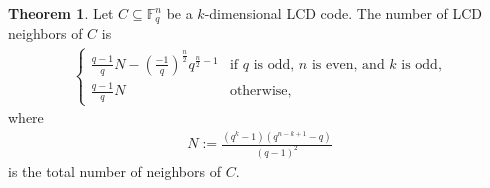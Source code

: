 \documentclass[11pt]{article}
\theoremstyle{definition}
\newtheorem{theorem}{Theorem}[section]
\newcommand{\F}{\mathbb{F}}
\newcommand{\Leg}[2]{\left(\frac{#1}{#2}\right)}                       %
\begin{document}
\begin{theorem}\label{thm:LCD-neighbors}
	Let $C \subseteq \F_q^n$ be a $k$-dimensional LCD code.
	The number of LCD neighbors of $C$ is
	\begin{align*}
		\begin{cases}
			\frac{q - 1}{q} N - {\Leg{-1}{q}}^{\frac{n}{2}} q^{\frac{n}{2} - 1}
			& \text{if $q$ is odd, $n$ is even, and $k$ is odd,} \\
			\frac{q - 1}{q} N
			& \text{otherwise,}
		\end{cases}
	\end{align*}
	where
	\begin{align*}
		N := \frac{(q^k - 1)(q^{n - k + 1} - q)}{{(q - 1)}^2}
	\end{align*}
	is the total number of neighbors of $C$.
\end{theorem}
\end{document}
